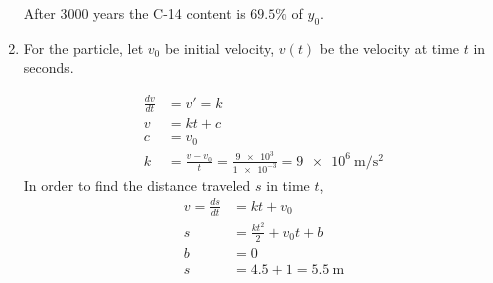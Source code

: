 \begin{enumerate}
          \begin{figure}[H]
              \centering
          \end{figure}
          After 3000 years the C-14 content is $ 69.5 \% $ of $ y_{0} $.

    \item For the particle, let $ v_{0} $ be initial velocity, $ v (t) $ be the velocity at time $ t $
          in seconds.

          \begin{align}
              \frac{dv}{dt} & = v' = k                                                                                    \\
              v             & = kt + c                                                                                    \\
              c             & = v_{0}                                                                                     \\
              k             & =\frac{v - v_{0}}{t} = \frac{\num{9e3}}{\num{1e-3}} = \SI{9e6}{\meter \per \square \second}
          \end{align}
          In order to find the distance traveled $ s $ in time $ t $,
          \begin{align}
              v = \frac{ds}{dt} & = kt + v_{0}                    \\
              s                 & = \frac{kt^{2}}{2} + v_{0}t + b \\
              b                 & = 0                             \\
              s                 & = 4.5 + 1 = \SI{5.5}{\meter}
          \end{align}



\end{enumerate}
